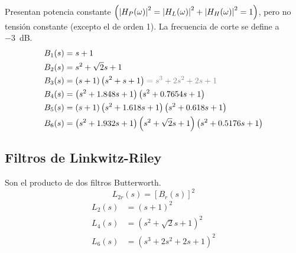 \documentclass[a4paper, 8pt]{extarticle}
\begin{document}
\begin{multicols}{3}
    Presentan potencia constante $\left( \abs{H_P (\omega)}^2 = \abs{H_L (\omega )}^2 + \abs{H_H (\omega )}^2   = 1\right)$, pero no tensión constante (excepto el de orden 1). La frecuencia de corte se define a \qty{-3}{\dB}.
    \begin{align*}
        B_1(s)  & = s + 1                                                                                             \\
        B_2(s)  & = s^2 + \sqrt{2} s + 1                                                                              \\
        B_3(s)  & =  \left( s+1 \right)\left( s^2 +s+1 \right) \color{gray} = s^3 + 2 s^2 + 2 s + 1 \color{black}     \\
        B_4(s)  & = \left( s^2 +1.848 s +1 \right) \left( s^2 +0.7654s +1 \right)                                     \\
        B_5(s)  & = \left( s + 1 \right) \left( s^2 + 1.618s + 1 \right) \left( s^2 + 0.618s + 1 \right)              \\
        B_6 (s) & = \left( s^2 + 1.932s + 1 \right) \left( s^2 + \sqrt{2}s +1 \right) \left( s^2 +0.5176s + 1 \right)
    \end{align*}

    \subsection{Filtros de Linkwitz-Riley}

    Son el producto de dos filtros Butterworth.
    \[ L_{2r}(s) = \left[ B_r (s)\right]^2 \]
    \begin{align*}
        L_2 (s) & = \left( s + 1 \right)^2               \\
        L_4 (s) & = \left( s^2 + \sqrt{2}s + 1 \right)^2 \\
        L_6 (s) & = \left( s^3  +2s^ 2 +2s +1 \right)^2  \\
    \end{align*}
\end{multicols}
\end{document}

